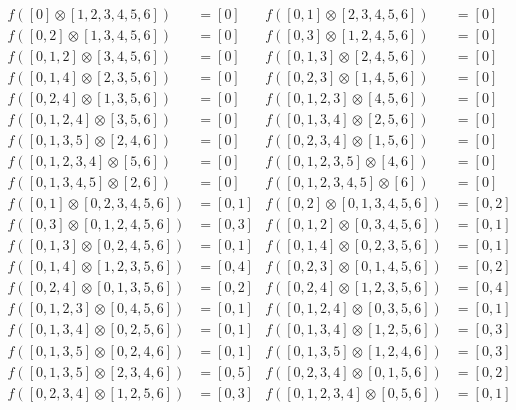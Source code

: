 \begin{align*}
f( [0] \otimes [1, 2, 3, 4, 5, 6] )&= [0] &
f( [0, 1] \otimes [2, 3, 4, 5, 6] )&= [0] \\
f( [0, 2] \otimes [1, 3, 4, 5, 6] )&= [0] &
f( [0, 3] \otimes [1, 2, 4, 5, 6] )&= [0] \\
f( [0, 1, 2] \otimes [3, 4, 5, 6] )&= [0] &
f( [0, 1, 3] \otimes [2, 4, 5, 6] )&= [0] \\
f( [0, 1, 4] \otimes [2, 3, 5, 6] )&= [0] &
f( [0, 2, 3] \otimes [1, 4, 5, 6] )&= [0] \\
f( [0, 2, 4] \otimes [1, 3, 5, 6] )&= [0] &
f( [0, 1, 2, 3] \otimes [4, 5, 6] )&= [0] \\
f( [0, 1, 2, 4] \otimes [3, 5, 6] )&= [0] &
f( [0, 1, 3, 4] \otimes [2, 5, 6] )&= [0] \\
f( [0, 1, 3, 5] \otimes [2, 4, 6] )&= [0] &
f( [0, 2, 3, 4] \otimes [1, 5, 6] )&= [0] \\
f( [0, 1, 2, 3, 4] \otimes [5, 6] )&= [0] &
f( [0, 1, 2, 3, 5] \otimes [4, 6] )&= [0] \\
f( [0, 1, 3, 4, 5] \otimes [2, 6] )&= [0] &
f( [0, 1, 2, 3, 4, 5] \otimes [6] )&= [0] \\
f( [0, 1] \otimes [0, 2, 3, 4, 5, 6] )&= [0, 1] &
f( [0, 2] \otimes [0, 1, 3, 4, 5, 6] )&= [0, 2] \\
f( [0, 3] \otimes [0, 1, 2, 4, 5, 6] )&= [0, 3] &
f( [0, 1, 2] \otimes [0, 3, 4, 5, 6] )&= [0, 1] \\
f( [0, 1, 3] \otimes [0, 2, 4, 5, 6] )&= [0, 1] &
f( [0, 1, 4] \otimes [0, 2, 3, 5, 6] )&= [0, 1] \\
f( [0, 1, 4] \otimes [1, 2, 3, 5, 6] )&= [0, 4] &
f( [0, 2, 3] \otimes [0, 1, 4, 5, 6] )&= [0, 2] \\
f( [0, 2, 4] \otimes [0, 1, 3, 5, 6] )&= [0, 2] &
f( [0, 2, 4] \otimes [1, 2, 3, 5, 6] )&= [0, 4] \\
f( [0, 1, 2, 3] \otimes [0, 4, 5, 6] )&= [0, 1] &
f( [0, 1, 2, 4] \otimes [0, 3, 5, 6] )&= [0, 1] \\
f( [0, 1, 3, 4] \otimes [0, 2, 5, 6] )&= [0, 1] &
f( [0, 1, 3, 4] \otimes [1, 2, 5, 6] )&= [0, 3] \\
f( [0, 1, 3, 5] \otimes [0, 2, 4, 6] )&= [0, 1] &
f( [0, 1, 3, 5] \otimes [1, 2, 4, 6] )&= [0, 3] \\
f( [0, 1, 3, 5] \otimes [2, 3, 4, 6] )&= [0, 5] &
f( [0, 2, 3, 4] \otimes [0, 1, 5, 6] )&= [0, 2] \\
f( [0, 2, 3, 4] \otimes [1, 2, 5, 6] )&= [0, 3] &
f( [0, 1, 2, 3, 4] \otimes [0, 5, 6] )&= [0, 1] \\

\end{align*}
